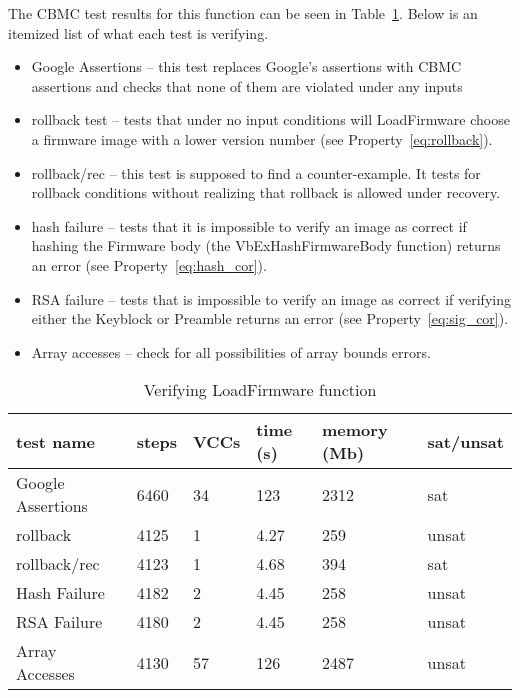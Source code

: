 The CBMC test results for this function can be seen in Table~\ref{ldfw_results}. 
Below is an itemized list of what each test is verifying.

\begin{itemize}
 \item  Google Assertions -- this test replaces Google's assertions with CBMC assertions and checks that none of them are violated under any inputs
 \item  rollback test -- tests that under no input conditions will LoadFirmware choose a firmware image with a lower version number (see Property~\ref{eq:rollback}).
 \item  rollback/rec  -- this test is supposed to find a counter-example. It tests for rollback conditions without realizing that rollback is allowed under recovery. 
 \item  hash failure -- tests that it is impossible to verify an image as correct  if hashing the Firmware body (the VbExHashFirmwareBody function) returns an error (see Property~\ref{eq:hash_cor}).
 \item  RSA failure -- tests that is impossible to verify an image as correct if verifying either the Keyblock or Preamble returns an error (see Property~\ref{eq:sig_cor}).
 \item  Array accesses -- check for all possibilities of array bounds errors.
\end{itemize}

\begin{table}[!htbp]
    \centering
    \caption{Verifying LoadFirmware function}\label{ldfw_results}
    \begin{tabular}{llllll}
        \toprule
        test name & steps & VCCs  & time (s) & memory (Mb) & sat/unsat  \\ \bottomrule
        Google Assertions & 6460 & 34 & 123 & 2312 & sat \\
        rollback     & 4125 & 1 & 4.27 & 259 & unsat \\
        rollback/rec & 4123 & 1 & 4.68 & 394 & sat \\
        Hash Failure & 4182 & 2 & 4.45 & 258 & unsat \\
        RSA  Failure & 4180 & 2 & 4.45 & 258 & unsat \\
        Array Accesses & 4130 & 57 & 126 & 2487 & unsat \\\bottomrule
    \end{tabular}
\end{table}

